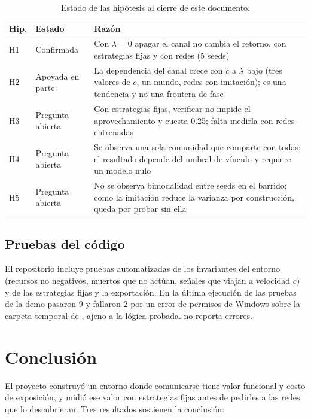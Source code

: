 \documentclass[11pt,a4paper]{article}
\newcommand{\codigo}[1]{\texttt{\detokenize{#1}}}
\begin{document}
\begin{table}[H]
\centering\small
\begin{tabular}{@{}l p{4cm} p{8cm}@{}}
\toprule
Hip. & Estado & Raz\'on \\
\midrule
H1 & Confirmada & Con $\lambda=0$ apagar el canal no cambia el retorno, con estrategias fijas y con redes (5 seeds) \\
H2 & Apoyada en parte & La dependencia del canal crece con $c$ a $\lambda$ bajo (tres valores de $c$, un mundo, redes con imitaci\'on); es una tendencia y no una frontera de fase \\
H3 & Pregunta abierta & Con estrategias fijas, verificar no impide el aprovechamiento y cuesta 0.25; falta medirla con redes entrenadas \\
H4 & Pregunta abierta & Se observa una sola comunidad que comparte con todas; el resultado depende del umbral de v\'inculo y requiere un modelo nulo \\
H5 & Pregunta abierta & No se observa bimodalidad entre seeds en el barrido; como la imitaci\'on reduce la varianza por construcci\'on, queda por probar sin ella \\
\bottomrule
\end{tabular}
\caption{Estado de las hip\'otesis al cierre de este documento.}
\end{table}

\subsection{Pruebas del c\'odigo}

El repositorio incluye pruebas automatizadas de los invariantes del entorno (recursos no negativos, muertos que no act\'uan, se\~nales que viajan a velocidad $c$) y de las estrategias fijas y la exportaci\'on. En la \'ultima ejecuci\'on de las pruebas de la demo pasaron 9 y fallaron 2 por un error de permisos de Windows sobre la carpeta temporal de \codigo{pytest}, ajeno a la l\'ogica probada. \codigo{ruff} no reporta errores.

\section{Conclusi\'on}

El proyecto construy\'o un entorno donde comunicarse tiene valor funcional y costo de exposici\'on, y midi\'o ese valor con estrategias fijas antes de pedirles a las redes que lo descubrieran. Tres resultados sostienen la conclusi\'on:
\end{document}

